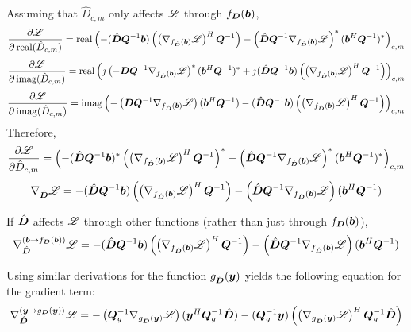 \begin{appendices}
Assuming that $\hat{D}_{c,m}$ only affects $\mathscr{L}$ through $f_{\bm{D}}(\bm{b})$,
\begin{equation}
\frac{\partial \mathscr{L}}{\partial \operatorname{real}(\hat{D}_{c,m})} = \operatorname{real}\left(-(\hat{\bm{D}}\bm{Q}^{-1}\bm{b})\left(\left(\nabla_{f_{\hat{\bm{D}}}(\bm{b})} \mathscr{L}\right)^H\bm{Q}^{-1}\right) - \left(\hat{\bm{D}}\bm{Q}^{-1}\nabla_{f_{\hat{\bm{D}}}(\bm{b})} \mathscr{L}\right)^* (\bm{b}^H\bm{Q}^{-1})^*\right)_{c,m}
\end{equation}
\begin{equation}
\frac{\partial \mathscr{L}}{\partial \operatorname{imag}(\hat{D}_{c,m})} = \operatorname{real}\left(j\left(-\bm{D}\bm{Q}^{-1}\nabla_{f_{\hat{\bm{D}}}(\bm{b})} \mathscr{L}\right)^*(\bm{b}^H\bm{Q}^{-1})^* + j(\hat{\bm{D}}\bm{Q}^{-1}\bm{b})\left(\left(\nabla_{f_{\hat{\bm{D}}}(\bm{b})} \mathscr{L}\right)^H\bm{Q}^{-1}\right)\right)_{c,m}
\end{equation}
\begin{equation}
\frac{\partial \mathscr{L}}{\partial \operatorname{imag}(\hat{D}_{c,m})} = \operatorname{imag}\left(-\left(\bm{D}\bm{Q}^{-1}\nabla_{f_{\hat{\bm{D}}}(\bm{b})} \mathscr{L}\right)(\bm{b}^H\bm{Q}^{-1}) - (\hat{\bm{D}}\bm{Q}^{-1}\bm{b})\left(\left(\nabla_{f_{\hat{\bm{D}}}(\bm{b})} \mathscr{L}\right)^H\bm{Q}^{-1}\right)\right)_{c,m}
\end{equation}
Therefore,
\begin{equation}
\frac{\partial \mathscr{L}}{\partial \hat{D}_{c,m}} = \left(-(\hat{\bm{D}}\bm{Q}^{-1}\bm{b})^*\left(\left(\nabla_{f_{\hat{\bm{D}}}(\bm{b})} \mathscr{L}\right)^H\bm{Q}^{-1}\right)^* - \left(\hat{\bm{D}}\bm{Q}^{-1}\nabla_{f_{\hat{\bm{D}}}(\bm{b})} \mathscr{L}\right)^* (\bm{b}^H\bm{Q}^{-1})^*\right)_{c,m}
\end{equation}
\begin{equation}
\nabla_{\hat{\bm{D}}} \mathscr{L} = -(\hat{\bm{D}}\bm{Q}^{-1}\bm{b})\left(\left(\nabla_{f_{\hat{\bm{D}}}(\bm{b})} \mathscr{L}\right)^H\bm{Q}^{-1}\right) - \left(\hat{\bm{D}}\bm{Q}^{-1}\nabla_{f_{\hat{\bm{D}}}(\bm{b})} \mathscr{L}\right) (\bm{b}^H\bm{Q}^{-1})
\end{equation}

If $\hat{\bm{D}}$ affects $\mathscr{L}$ through other functions (rather than just through $f_{\bm{D}}(\bm{b})$),
\begin{equation}
\nabla^{(\bm{b} \rightarrow f_{\bm{D}}(\bm{b}))}_{\hat{\bm{D}}} \mathscr{L} = -(\hat{\bm{D}}\bm{Q}^{-1}\bm{b})\left(\left(\nabla_{f_{\hat{\bm{D}}}(\bm{b})} \mathscr{L}\right)^H\bm{Q}^{-1}\right) - \left(\hat{\bm{D}}\bm{Q}^{-1}\nabla_{f_{\hat{\bm{D}}}(\bm{b})} \mathscr{L}\right) (\bm{b}^H\bm{Q}^{-1})
\end{equation}


Using similar derivations for the function $g_{\hat{\bm{D}}}(\bm{y})$ yields the following equation for the gradient term:
\begin{equation}
\nabla^{(\bm{y} \rightarrow g_{\bm{D}}(\bm{y}))}_{\hat{\bm{D}}} \mathscr{L} = -\left(\bm{Q}_g^{-1}\nabla_{g_{\hat{\bm{D}}}(\bm{y})} \mathscr{L}\right)(\bm{y}^H\bm{Q}_g^{-1}\hat{\bm{D}}) - (\bm{Q}_g^{-1}\bm{y})\left(\left(\nabla_{g_{\hat{\bm{D}}}(\bm{y})} \mathscr{L}\right)^H\bm{Q}_g^{-1}\hat{\bm{D}}\right)
\end{equation}



\end{appendices}
